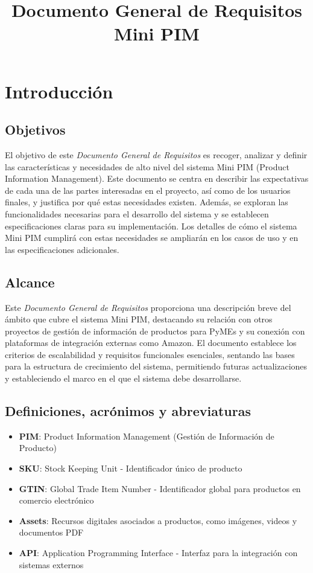 \documentclass{article}
\title{Documento General de Requisitos Mini PIM}
\author{}
\date{}
\begin{document}
\maketitle

\tableofcontents

\newpage

\section{Introducción}

\subsection{Objetivos}

El objetivo de este \textit{Documento General de Requisitos} es recoger, analizar y definir las características y necesidades de alto nivel del sistema Mini PIM (Product Information Management). Este documento se centra en describir las expectativas de cada una de las partes interesadas en el proyecto, así como de los usuarios finales, y justifica por qué estas necesidades existen. Además, se exploran las funcionalidades necesarias para el desarrollo del sistema y se establecen especificaciones claras para su implementación. Los detalles de cómo el sistema Mini PIM cumplirá con estas necesidades se ampliarán en los casos de uso y en las especificaciones adicionales.

\subsection{Alcance}

Este \textit{Documento General de Requisitos} proporciona una descripción breve del ámbito que cubre el sistema Mini PIM, destacando su relación con otros proyectos de gestión de información de productos para PyMEs y su conexión con plataformas de integración externas como Amazon. El documento establece los criterios de escalabilidad y requisitos funcionales esenciales, sentando las bases para la estructura de crecimiento del sistema, permitiendo futuras actualizaciones y estableciendo el marco en el que el sistema debe desarrollarse.


\subsection{Definiciones, acrónimos y abreviaturas}

\begin{itemize}
    \item \textbf{PIM}: Product Information Management (Gestión de Información de Producto)
    \item \textbf{SKU}: Stock Keeping Unit - Identificador único de producto
    \item \textbf{GTIN}: Global Trade Item Number - Identificador global para productos en comercio electrónico
    \item \textbf{Assets}: Recursos digitales asociados a productos, como imágenes, videos y documentos PDF
    \item \textbf{API}: Application Programming Interface - Interfaz para la integración con sistemas externos
\end{itemize}
\end{document}
